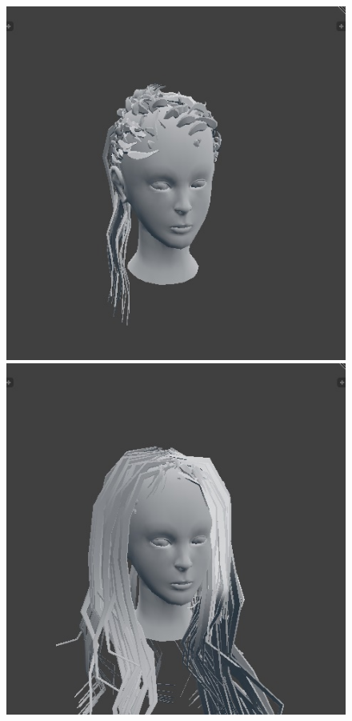 \documentclass[ %
author={Dillon Keith Diep},
supervisor={Dr. Carl Henrik Ek},
degree={MEng},
title={ART-CG Hair:},
subtitle={Assisted Real-time Content Generation of Stylised Virtual Hair},
type={Research},
year={2017} ]{dissertation}
\begin{document}
\begin{figure}[!h]
		\includegraphics[scale=0.25]{images/outputMesh9}
		\includegraphics[scale=0.25]{images/outputMesh10}

\end{figure}
\end{document}
